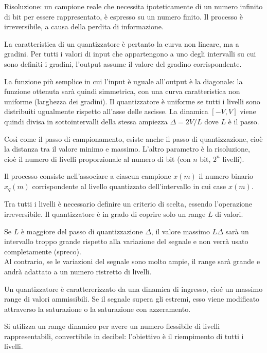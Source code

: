 Risoluzione: un campione reale che necessita ipoteticamente di un numero infinito di bit per essere rappresentato, è espresso su un numero finito. Il processo è irreversibile, a causa della perdita di informazione.

La caratteristica di un quantizzatore è pertanto la curva non lineare, ma a gradini. Per tutti i valori di input che appartengono a uno degli intervalli su cui sono definiti i gradini, l'output assume il valore del gradino corrispondente.

La funzione più semplice in cui l'input è uguale all'output è la diagonale: la funzione ottenuta sarà quindi simmetrica, con una curva caratteristica non uniforme (larghezza dei gradini). Il quantizzatore è uniforme se tutti i livelli sono distribuiti ugualmente rispetto all'asse delle ascisse. La dinamica $[-V, V]$ viene quindi divisa in sottointervalli della stessa ampiezza $\Delta = 2V / L$ dove $L$ è il passo. 

Così come il passo di campionamento, esiste anche il passo di quantizzazione, cioè la distanza tra il valore minimo e massimo. L'altro parametro è la risoluzione, cioè il numero di livelli proporzionale al numero di bit (con $n$ bit, $2^n$ livelli). 

Il processo consiste nell'associare a ciascun campione $x(m)$ il numero binario $x_q(m)$ corrispondente al livello quantizzato dell'intervallo in cui case $x(m)$.

Tra tutti i livelli è necessario definire un criterio di scelta, essendo l'operazione irreversibile. Il quantizzatore è in grado di coprire solo un range $L$ di valori.

Se $L$ è maggiore del passo di quantizzazione $\Delta$, il valore massimo $L\Delta$ sarà un intervallo troppo grande rispetto alla variazione del segnale e non verrà usato completamente (spreco). \\
Al contrario, se le variazioni del segnale sono molto ampie, il range sarà grande e andrà adattato a un numero ristretto di livelli. 

Un quantizzatore è carattererizzato da una dinamica di ingresso, cioé un massimo range di valori ammissibili. Se il segnale supera gli estremi, esso viene modificato attraverso la saturazione o la saturazione con azzeramento.


Si utilizza un range dinamico per avere un numero flessibile di livelli rappresentabili, convertibile in decibel: l'obiettivo è il riempimento di tutti i livelli.

